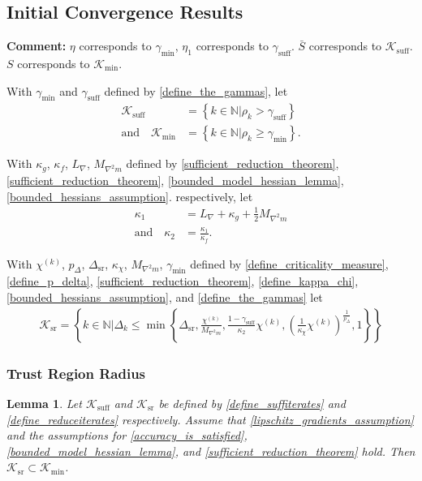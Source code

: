\documentclass{article}
\newenvironment{comment}
  {\par\medskip
   \color{red}%
   \begin{framed}
   \textbf{Comment: }\ignorespaces}
 {\end{framed}
  \medskip}
\newtheorem{lemma}[theorem]{Lemma}
\theoremstyle{case}
\numberwithin{theorem}{subsection}
\newcommand{\chik}{{\chi^{(k)}}}
\newcommand{\dk}{\Delta_k}
\newcommand{\dsr}{{\Delta_{\textrm{sr}}}}
\newcommand{\gammabi}{\gamma_{\textrm{suff}}}
\newcommand{\gammasm}{\gamma_{\textrm{min}}}
\newcommand{\lipgrad}{{L_{\nabla}}}
\newcommand{\maxmodelhessian}{{M_{\nabla^2 m}}}
\newcommand{\naturals}{\mathbb N}
\newcommand{\rk}{\rho_k}
\newcommand{\suffiterates}{{\mathcal K_{\textrm{suff}}}}
\newcommand{\miniterates}{{\mathcal K_{\textrm{min}}}}
\newcommand{\reduceiterates}{{\mathcal K_{\textrm{sr}}}}
\newcommand{\theircnot}{{\kappa_1}}
\newcommand{\theirc}{{\kappa_2}}
\begin{document}
\subsection{Initial Convergence Results}
\label{initial_convergence_results}
\begin{comment}
$\eta$ corresponds to $\gammasm$, $\eta_1$ corresponds to $\gammabi$.
$\bar S$ corresponds to $\suffiterates$.
$S$ corresponds to $\miniterates$.
\end{comment}


With 
$\gammasm$ and $\gammabi$
defined by \cref{define_the_gammas},
let
\begin{align}
\suffiterates &= \left\{k \in \naturals | \rk > \gammabi \right\} \label{define_suffiterates} \\
\textrm{and} \quad \miniterates &= \left\{k \in \naturals | \rk \ge \gammasm \right\} \label{define_miniterates}.
\end{align}

With
$\kappa_g$, $\kappa_f$, $\lipgrad$, $\maxmodelhessian$
defined by
\cref{sufficient_reduction_theorem}, \cref{sufficient_reduction_theorem}, \cref{bounded_model_hessian_lemma}, \cref{bounded_hessians_assumption}.
respectively, let
\begin{align}
\theircnot &= \lipgrad + \kappa_{g} + \frac 1 2 \maxmodelhessian \label{define_theircnot} \\
\textrm{and} \quad \theirc &= \frac{\theircnot}{\kappa_f} .  \label{define_theirc}
\end{align}

With
$\chik$, $p_{\Delta}$, $\dsr$, $\kappa_{\chi}$, $\maxmodelhessian$, $\gammasm$
defined by 
\cref{define_criticality_measure}, \cref{define_p_delta}, \cref{sufficient_reduction_theorem}, \cref{define_kappa_chi}, \cref{bounded_hessians_assumption}, and \cref{define_the_gammas}
let
\begin{align}
\label{define_reduceiterates}
\reduceiterates = \left \{ k \in \naturals \bigg| \dk \le \min \left\{ 
\dsr, 
\frac {\chik}{\maxmodelhessian}, 
\frac{1-\gammabi}{\theirc}\chik,
\left(\frac 1 {\kappa_{\chi}}  \chik\right)^{\frac 1 {p_{\Delta}}}, 
1
\right\} \right \} 
\end{align}

\subsubsection{Trust Region Radius}

\begin{lemma}
\label{mathcal_k_subset_bar_s}
Let $\suffiterates$ and $\reduceiterates$ be defined by \cref{define_suffiterates} and \cref{define_reduceiterates} respectively.
Assume that 
\cref{lipschitz_gradients_assumption}
and the assumptions for
\cref{accuracy_is_satisfied},
\cref{bounded_model_hessian_lemma},
and \cref{sufficient_reduction_theorem}
hold.
Then $\reduceiterates \subset \miniterates$.
\end{lemma}
 
\end{document}
